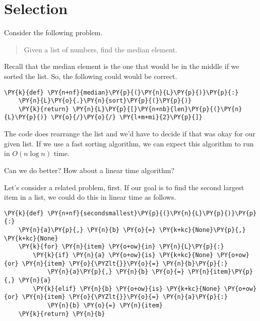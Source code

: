 \chapter{Selection}


Consider the following problem.

\begin{quote}

Given a list of numbers, find the median element.

\end{quote}

Recall that the median element is the one that would be in the middle if we sorted the list.
So, the following could would be correct.

\begin{Verbatim}[commandchars=\\\{\}]
\PY{k}{def} \PY{n+nf}{median}\PY{p}{(}\PY{n}{L}\PY{p}{)}\PY{p}{:}
    \PY{n}{L}\PY{o}{.}\PY{n}{sort}\PY{p}{(}\PY{p}{)}
    \PY{k}{return} \PY{n}{L}\PY{p}{[}\PY{n+nb}{len}\PY{p}{(}\PY{n}{L}\PY{p}{)} \PY{o}{/}\PY{o}{/} \PY{l+m+mi}{2}\PY{p}{]}
\end{Verbatim}



The code does rearrange the list and we'd have to decide if that was okay for our given list.
If we use a fast sorting algorithm, we can expect this algorithm to run in $O(n\log n)$ time.


Can we do better?
How about a linear time algorithm?


Let's consider a related problem, first.
If our goal is to find the second largest item in a list, we could do this in linear time as follows.

\begin{Verbatim}[commandchars=\\\{\}]
\PY{k}{def} \PY{n+nf}{secondsmallest}\PY{p}{(}\PY{n}{L}\PY{p}{)}\PY{p}{:}
    \PY{n}{a}\PY{p}{,} \PY{n}{b} \PY{o}{=} \PY{k+kc}{None}\PY{p}{,} \PY{k+kc}{None}
    \PY{k}{for} \PY{n}{item} \PY{o+ow}{in} \PY{n}{L}\PY{p}{:}
        \PY{k}{if} \PY{n}{a} \PY{o+ow}{is} \PY{k+kc}{None} \PY{o+ow}{or} \PY{n}{item} \PY{o}{\PYZlt{}}\PY{o}{=} \PY{n}{b}\PY{p}{:}
            \PY{n}{a}\PY{p}{,} \PY{n}{b} \PY{o}{=} \PY{n}{item}\PY{p}{,} \PY{n}{a}
        \PY{k}{elif} \PY{n}{b} \PY{o+ow}{is} \PY{k+kc}{None} \PY{o+ow}{or} \PY{n}{item} \PY{o}{\PYZlt{}}\PY{o}{=} \PY{n}{a}\PY{p}{:}
            \PY{n}{b} \PY{o}{=} \PY{n}{item}
    \PY{k}{return} \PY{n}{b}
\end{Verbatim}



